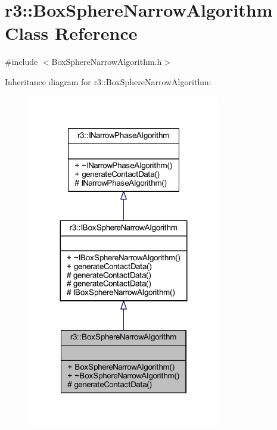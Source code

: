 \hypertarget{classr3_1_1_box_sphere_narrow_algorithm}{}\section{r3\+:\+:Box\+Sphere\+Narrow\+Algorithm Class Reference}
\label{classr3_1_1_box_sphere_narrow_algorithm}


{\ttfamily \#include $<$Box\+Sphere\+Narrow\+Algorithm.\+h$>$}



Inheritance diagram for r3\+:\+:Box\+Sphere\+Narrow\+Algorithm\+:\nopagebreak
\begin{figure}[H]
\begin{center}
\leavevmode
\includegraphics[width=239pt]{classr3_1_1_box_sphere_narrow_algorithm__inherit__graph}
\end{center}
\end{figure}


